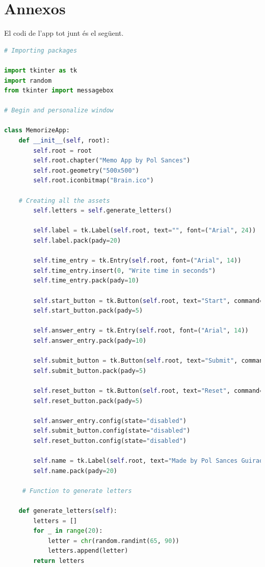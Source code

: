 \part{Annexos}
\pagestyle{annex1}

El codi de l'app tot junt és el següent.

\begin{lstlisting}[language=Python, style=colorEX, caption=Codi sencer de l'App]
    # Importing packages

import tkinter as tk
import random
from tkinter import messagebox

# Begin and personalize window

class MemorizeApp:
    def __init__(self, root):
        self.root = root
        self.root.chapter("Memo App by Pol Sances")
        self.root.geometry("500x500")
        self.root.iconbitmap("Brain.ico")

    # Creating all the assets
        self.letters = self.generate_letters()

        self.label = tk.Label(self.root, text="", font=("Arial", 24))
        self.label.pack(pady=20)

        self.time_entry = tk.Entry(self.root, font=("Arial", 14))
        self.time_entry.insert(0, "Write time in seconds")
        self.time_entry.pack(pady=10)

        self.start_button = tk.Button(self.root, text="Start", command=self.start_memorize)
        self.start_button.pack(pady=5)

        self.answer_entry = tk.Entry(self.root, font=("Arial", 14))
        self.answer_entry.pack(pady=10)

        self.submit_button = tk.Button(self.root, text="Submit", command=self.check_answers)
        self.submit_button.pack(pady=5)

        self.reset_button = tk.Button(self.root, text="Reset", command=self.reset)
        self.reset_button.pack(pady=5)

        self.answer_entry.config(state="disabled")
        self.submit_button.config(state="disabled")
        self.reset_button.config(state="disabled")

        self.name = tk.Label(self.root, text="Made by Pol Sances Guirao", font=("Arial", 8))
        self.name.pack(pady=20)

     # Function to generate letters

    def generate_letters(self):
        letters = []
        for _ in range(20):
            letter = chr(random.randint(65, 90))
            letters.append(letter)
        return letters
    

\end{lstlisting}
